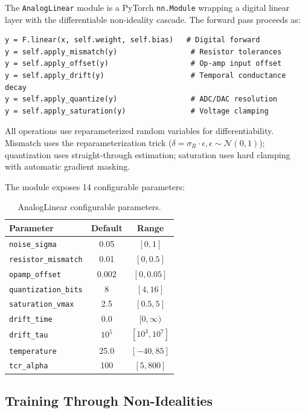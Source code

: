 \documentclass[10pt,twocolumn]{article}
\begin{document}
The \texttt{AnalogLinear} module is a PyTorch \texttt{nn.Module} wrapping a digital linear layer with the differentiable non-ideality cascade. The forward pass proceeds as:

\begin{verbatim}
y = F.linear(x, self.weight, self.bias)   # Digital forward
y = self.apply_mismatch(y)                 # Resistor tolerances
y = self.apply_offset(y)                   # Op-amp input offset
y = self.apply_drift(y)                    # Temporal conductance decay
y = self.apply_quantize(y)                 # ADC/DAC resolution
y = self.apply_saturation(y)               # Voltage clamping
\end{verbatim}

All operations use reparameterized random variables for differentiability. Mismatch uses the reparameterization trick ($\delta = \sigma_R \cdot \epsilon, \epsilon \sim \mathcal{N}(0,1)$); quantization uses straight-through estimation; saturation uses hard clamping with automatic gradient masking.

The module exposes 14 configurable parameters:

\begin{table}[t]
  \centering
  \caption{AnalogLinear configurable parameters.}
  \label{tab:params}
  \begin{tabular}{lcc}
    \toprule
    Parameter & Default & Range \\
    \midrule
    \texttt{noise\_sigma} & 0.05 & $[0, 1]$ \\
    \texttt{resistor\_mismatch} & 0.01 & $[0, 0.5]$ \\
    \texttt{opamp\_offset} & 0.002 & $[0, 0.05]$ \\
    \texttt{quantization\_bits} & 8 & $[4, 16]$ \\
    \texttt{saturation\_vmax} & 2.5 & $[0.5, 5]$ \\
    \texttt{drift\_time} & 0.0 & $[0, \infty)$ \\
    \texttt{drift\_tau} & $10^5$ & $[10^3, 10^7]$ \\
    \texttt{temperature} & 25.0 & $[-40, 85]$ \\
    \texttt{tcr\_alpha} & 100 & $[5, 800]$ \\
    \bottomrule
  \end{tabular}
\end{table}

\subsection{Training Through Non-Idealities}
\end{document}
